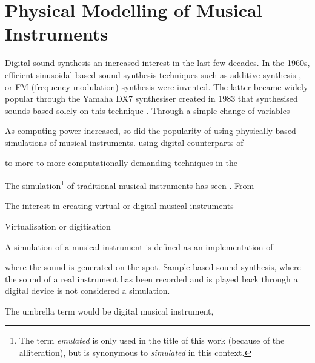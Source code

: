 \chapter{Physical Modelling of Musical Instruments}\label{ch:physMod}
Digital sound synthesis an increased interest in the last few decades. In the 1960s, efficient sinusoidal-based sound synthesis techniques such as additive synthesis \cite{additive}, or FM (frequency modulation) synthesis \cite{Chowning} were invented. The latter became widely popular through the Yamaha DX7 synthesiser created in 1983 that synthesised sounds based solely on this technique \cite{DX7}. Through a simple change of variables 

As computing power increased, so did the popularity of using physically-based simulations of musical instruments.  using digital counterparts of 

to more to more computationally demanding techniques in the 





The simulation\footnote{The term \textit{emulated} is only used in the title of this work (because of the alliteration), but is synonymous to \textit{simulated} in this context.}  of traditional musical instruments has seen . From 





The interest in creating virtual or digital musical instruments 

Virtualisation or digitisation 

A simulation of a musical instrument is defined as an implementation of 

where the sound is generated on the spot. Sample-based sound synthesis, where the sound of a real instrument has been recorded and is played back through a digital device is not considered a simulation.

The umbrella term would be digital musical instrument,  

